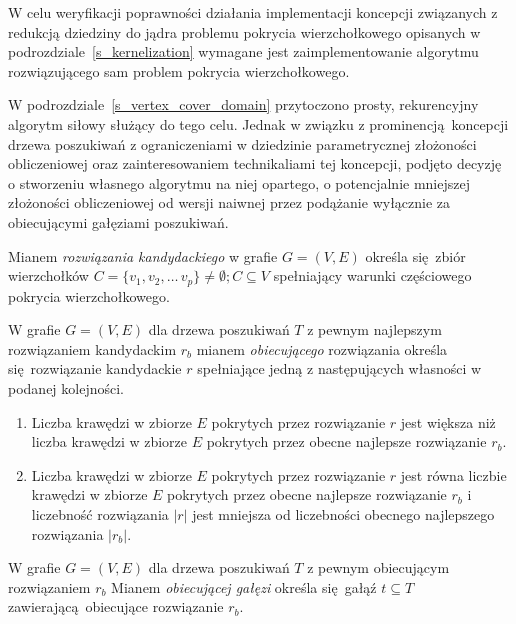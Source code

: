 \par{
  W celu weryfikacji poprawności działania implementacji koncepcji związanych z redukcją dziedziny do jądra problemu pokrycia wierzchołkowego opisanych w podrozdziale~\ref{s_kernelization} wymagane jest zaimplementowanie algorytmu rozwiązującego sam problem pokrycia wierzchołkowego.

  W podrozdziale~\ref{s_vertex_cover_domain} przytoczono prosty, rekurencyjny algorytm siłowy służący do tego celu.
  Jednak w związku z prominencją koncepcji drzewa poszukiwań z ograniczeniami w dziedzinie parametrycznej złożoności obliczeniowej oraz zainteresowaniem technikaliami tej koncepcji, podjęto decyzję o stworzeniu własnego algorytmu na niej opartego, o potencjalnie mniejszej złożoności obliczeniowej od wersji naiwnej przez podążanie wyłącznie za obiecującymi gałęziami poszukiwań.

  \begin{definition}
    Mianem \emph{rozwiązania kandydackiego} w grafie $G=(V, E)$ określa się zbiór wierzchołków $C=\{v_1, v_2, \ldots\, v_p\} \neq \emptyset; C \subseteq V$ spełniający warunki częściowego pokrycia wierzchołkowego.
  \end{definition}
  \begin{definition}
    W grafie $G=(V,E)$ dla drzewa poszukiwań $T$ z pewnym najlepszym rozwiązaniem kandydackim $r_b$ mianem \emph{obiecującego} rozwiązania określa się rozwiązanie kandydackie $r$ spełniające jedną z następujących własności w podanej kolejności.
    \begin{enumerate}
      \item Liczba krawędzi w zbiorze $E$ pokrytych przez rozwiązanie $r$ jest większa niż liczba krawędzi w zbiorze $E$ pokrytych przez obecne najlepsze rozwiązanie $r_b$.
      \item Liczba krawędzi w zbiorze $E$ pokrytych przez rozwiązanie $r$ jest równa liczbie krawędzi w zbiorze $E$ pokrytych przez obecne najlepsze rozwiązanie $r_b$ i liczebność rozwiązania $|r|$ jest mniejsza od liczebności obecnego najlepszego rozwiązania $|r_b|$.
    \end{enumerate}
  \end{definition}
  \begin{definition}
     W grafie $G=(V, E)$ dla drzewa poszukiwań $T$ z pewnym obiecującym rozwiązaniem $r_b$ Mianem \emph{obiecującej gałęzi} określa się gałąź $t \subseteq T$ zawierającą obiecujące rozwiązanie $r_b$.
  \end{definition}
}
